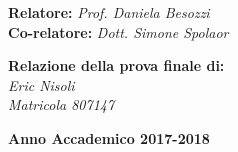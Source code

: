 \documentclass[11pt, a4paper, oneside]{Thesis} %
\begin{document}
\begin{titlepage}
	\vspace{50mm}
	
	\noindent
	{\large \textbf{Relatore:} \textit{Prof. Daniela Besozzi} } \\
	
	\noindent
	{\large \textbf{Co-relatore:} \textit{Dott. Simone Spolaor }}
	
	\vspace{15mm}
	
	\begin{flushright}
		{\large \textbf{Relazione della prova finale di:}} \\
		\large{\textit{Eric Nisoli}} \\
		\large{\textit{Matricola 807147}} 
	\end{flushright}
	
	\vspace{20mm}
	\begin{center}
		{\large{\bf Anno Accademico 2017-2018}}
	\end{center}
	
\end{titlepage}

\frontmatter %


\fancyhead{} %
\rhead{\thepage} %
\lhead{} %

\pagestyle{fancy} %





\end{document}
